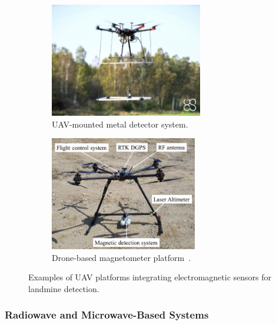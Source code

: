 \begin{figure}[h!]
    \centering
    \begin{subfigure}[b]{0.48\linewidth}
        \centering
        \includegraphics[height=5cm]{figs/Huirui/metal_detector_drone.png}
        \caption{UAV-mounted metal detector system\protect\footnotemark.}
        \label{fig:metal_detector_drone}
    \end{subfigure}
    \hfill
    \begin{subfigure}[b]{0.48\linewidth}
        \centering
        \includegraphics[height=5cm]{figs/Huirui/magnetometer_drone.png}
        \caption{Drone-based magnetometer platform~\cite{yoo2020drone}.}
        \label{fig:magnetometer_drone}
    \end{subfigure}
    \caption[UAV platforms with electromagnetic sensors for landmine detection]{Examples of UAV platforms integrating electromagnetic sensors for landmine detection.}
    \label{fig:emi_uav_examples}
\end{figure}




\subsubsection{Radiowave and Microwave-Based Systems}\label{Radiowave}

